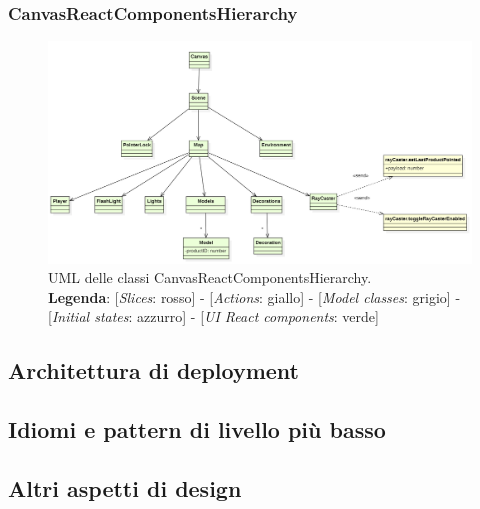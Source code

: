 \begin{landscape}
\thispagestyle{empty}
\subsubsection{CanvasReactComponentsHierarchy}
\begin{figure}[H]
	\centering
	\includegraphics[scale=0.7 , keepaspectratio]{./res/images/CanvasReactComponentsHierarchy.PNG}
	\caption[UML delle classi CanvasReactComponentsHierarchy]{
	UML delle classi CanvasReactComponentsHierarchy.
	\\
	\textbf{Legenda}: 
	[\textit{Slices}: rosso] -
	[\textit{Actions}: giallo] -
	[\textit{Model classes}: grigio] -
	[\textit{Initial states}: azzurro] -
	[\textit{UI React components}: verde]}
\end{figure}
\end{landscape}
\restoregeometry

\subsection{Architettura di deployment}
\subsection{Idiomi e pattern di livello più basso}
\subsection{Altri aspetti di design}
























